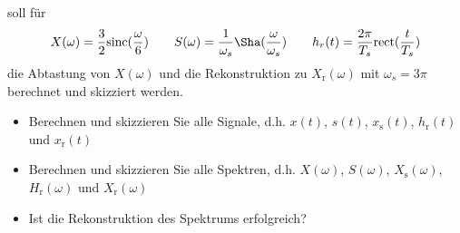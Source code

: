 soll für
\begin{align}
X(\omega) = \frac{3}{2}\mathrm{sinc}(\frac{\omega}{6})\qquad
%
S(\omega)=\frac{1}{\omega_s}\Sha(\frac{\omega}{\omega_s})\qquad
%
h_r(t) = \frac{2\pi}{T_s}\mathrm{rect}(\frac{t}{T_s})
\end{align}
die Abtastung von $X(\omega)$ und die Rekonstruktion zu $X_\mathrm{r}(\omega)$
mit $\omega_s = 3 \pi$ berechnet und skizziert werden.

\begin{itemize}
  \item Berechnen und skizzieren Sie alle Signale, d.h. $x(t)$, $s(t)$, $x_\mathrm{s}(t)$, $h_\mathrm{r}(t)$ und $x_\mathrm{r}(t)$
  \item Berechnen und skizzieren Sie alle Spektren, d.h.  $X(\omega)$, $S(\omega)$, $X_\mathrm{s}(\omega)$, $H_\mathrm{r}(\omega)$ und $X_\mathrm{r}(\omega)$
  \item Ist die Rekonstruktion des Spektrums erfolgreich?
\end{itemize}

